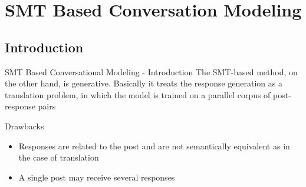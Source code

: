 \section{SMT Based Conversation Modeling}
\subsection{Introduction}
\begin{frame}{SMT Based Conversational Modeling - Introduction}
The SMT-based method, on the other hand, is generative. Basically it treats the response generation as a translation problem, in which the model is trained on a parallel corpus of post-response pairs
\end{frame}

\begin{frame}{Drawbacks}
\begin{itemize}
	\item Responses are related to the post and are not semantically equivalent as in the case of translation
	\item A single post may receive several responses
\end{itemize}
\end{frame}